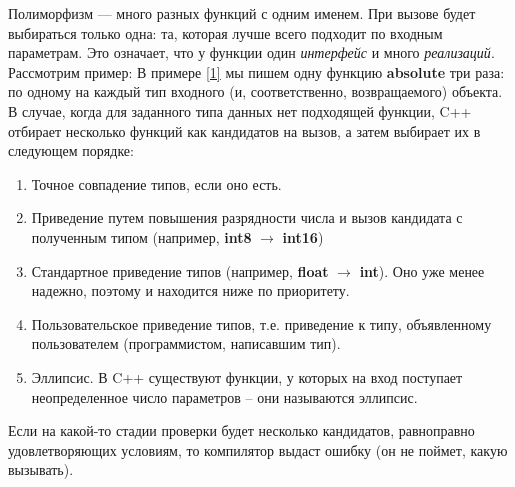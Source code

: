 \renewcommand{\lectureSubject}{Продвинутая работа с функциями}
%



\begin{lecture}[\lectureSubject]
	\begin{lecSection}
		Полиморфизм --- много разных функций с одним именем. При вызове будет выбираться только одна: та, которая лучше всего подходит по входным параметрам. Это означает, что у функции один \textit{интерфейс} и много \textit{реализаций}. Рассмотрим пример:
		В примере \ref{1} мы пишем одну функцию \textbf{absolute} три раза: по одному на каждый тип входного (и, соответственно, возвращаемого) объекта. В случае, когда для заданного типа данных нет подходящей функции, C++ отбирает несколько функций как кандидатов на вызов, а затем выбирает их в следующем порядке:
		\begin{enumerate}
			\label{cand}
			\item Точное совпадение типов, если оно есть.
			\item Приведение путем повышения разрядности числа и вызов кандидата с полученным типом (например, \textbf{int8} $\rightarrow$ \textbf{int16})
			\item Стандартное приведение типов (например, \textbf{float} $\rightarrow$ \textbf{int}). Оно уже менее надежно, поэтому и находится ниже по приоритету.
			\item Пользовательское приведение типов, т.е. приведение к типу, объявленному пользователем (программистом, написавшим тип).
			\item Эллипсис. В C++ существуют функции, у которых на вход поступает неопределенное число параметров -- они называются эллипсис.
		\end{enumerate}
		Если на какой-то стадии проверки будет несколько кандидатов, равноправно удовлетворяющих условиям, то компилятор выдаст ошибку (он не поймет, какую вызывать).
	\end{lecSection}

\end{lecture}
